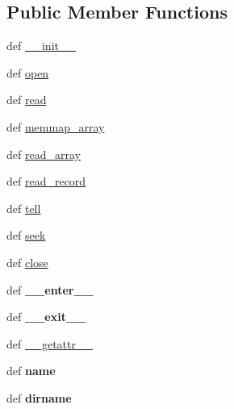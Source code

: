 \subsection*{Public Member Functions}
\begin{DoxyCompactItemize}
\item 
def \hyperlink{classtifffile_1_1FileHandle_a256d28d56fa26bdc5a54056626dba06b}{\-\_\-\-\_\-init\-\_\-\-\_\-}
\item 
def \hyperlink{classtifffile_1_1FileHandle_aed5fb2120f32ee43f63a74e51ee19014}{open}
\item 
def \hyperlink{classtifffile_1_1FileHandle_a11284915485b77b0666fab6c13ff3052}{read}
\item 
def \hyperlink{classtifffile_1_1FileHandle_a57407ec5af06d23c9bad8c8b94a4c1e4}{memmap\-\_\-array}
\item 
def \hyperlink{classtifffile_1_1FileHandle_ae9a3b8d51a50d9cac82f80a33e3c9887}{read\-\_\-array}
\item 
def \hyperlink{classtifffile_1_1FileHandle_ace4a33bbf8c889940fea17f043042ce3}{read\-\_\-record}
\item 
def \hyperlink{classtifffile_1_1FileHandle_ac6a2ba4f361ef961cb206c2199513c70}{tell}
\item 
def \hyperlink{classtifffile_1_1FileHandle_a88d4b64db22c7a55afae0428b5e0200a}{seek}
\item 
def \hyperlink{classtifffile_1_1FileHandle_a8c345933b2368352aa97ee72aaeda596}{close}
\item 
\hypertarget{classtifffile_1_1FileHandle_af0dcfc3f144e9ab96946cf8063142574}{def {\bfseries \-\_\-\-\_\-enter\-\_\-\-\_\-}}\label{classtifffile_1_1FileHandle_af0dcfc3f144e9ab96946cf8063142574}

\item 
\hypertarget{classtifffile_1_1FileHandle_a7a59eb04f16fee7fafead1200bb4871b}{def {\bfseries \-\_\-\-\_\-exit\-\_\-\-\_\-}}\label{classtifffile_1_1FileHandle_a7a59eb04f16fee7fafead1200bb4871b}

\item 
def \hyperlink{classtifffile_1_1FileHandle_a4ab2bf69b0a273e2ee43db2d9f2536b5}{\-\_\-\-\_\-getattr\-\_\-\-\_\-}
\item 
\hypertarget{classtifffile_1_1FileHandle_a65426db83982602cb1e3e301eddf9fd6}{def {\bfseries name}}\label{classtifffile_1_1FileHandle_a65426db83982602cb1e3e301eddf9fd6}

\item 
\hypertarget{classtifffile_1_1FileHandle_a1816f4d0d7568ebb37e4b473e527e106}{def {\bfseries dirname}}\label{classtifffile_1_1FileHandle_a1816f4d0d7568ebb37e4b473e527e106}


\end{DoxyCompactItemize}
